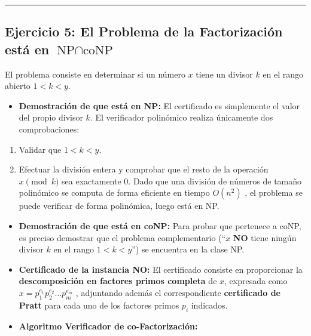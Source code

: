 \documentclass[12pt]{book} %
\providecommand{\tightlist}{%
  \setlength{\itemsep}{0pt}\setlength{\parskip}{0pt}}
\begin{document}
\begin{center}\rule{0.5\linewidth}{0.5pt}\end{center}

\hypertarget{ejercicio-5-el-problema-de-la-factorizaciuxf3n-estuxe1-en-textnp-cap-textconp}{%
\subsection{\texorpdfstring{Ejercicio 5: El Problema de la Factorización
está en
\(\text{NP} \cap \text{coNP}\)}{Ejercicio 5: El Problema de la Factorización está en \textbackslash text\{NP\} \textbackslash cap \textbackslash text\{coNP\}}}\label{ejercicio-5-el-problema-de-la-factorizaciuxf3n-estuxe1-en-textnp-cap-textconp}}

El problema consiste en determinar si un número \(x\) tiene un divisor
\(k\) en el rango abierto \(1 < k < y\).

\begin{itemize}
\tightlist
\item
  \textbf{Demostración de que está en NP:} El certificado es simplemente
  el valor del propio divisor \(k\). El verificador polinómico realiza
  únicamente dos comprobaciones:
\end{itemize}

\begin{enumerate}
\def\labelenumi{\arabic{enumi}.}
\tightlist
\item
  Validar que \(1 < k < y\).
\item
  Efectuar la división entera y comprobar que el resto de la operación
  \(x \pmod k\) sea exactamente \(0\). Dado que una división de números
  de tamaño polinómico se computa de forma eficiente en tiempo
  \(O(n^2)\) , el problema se puede verificar de forma polinómica, luego
  está en NP.
\end{enumerate}

\begin{itemize}
\item
  \textbf{Demostración de que está en coNP:} Para probar que pertenece a
  coNP, es preciso demostrar que el problema complementario (``\(x\)
  \textbf{NO} tiene ningún divisor \(k\) en el rango \(1 < k < y\)'') se
  encuentra en la clase NP.
\item
  \textbf{Certificado de la instancia NO:} El certificado consiste en
  proporcionar la \textbf{descomposición en factores primos completa} de
  \(x\), expresada como \(x = p_1^{e_1} p_2^{e_2} \dots p_m^{e_m}\) ,
  adjuntando además el correspondiente \textbf{certificado de Pratt}
  para cada uno de los factores primos \(p_i\) indicados.
\item
  \textbf{Algoritmo Verificador de co-Factorización:}
\end{itemize}
\end{document}
